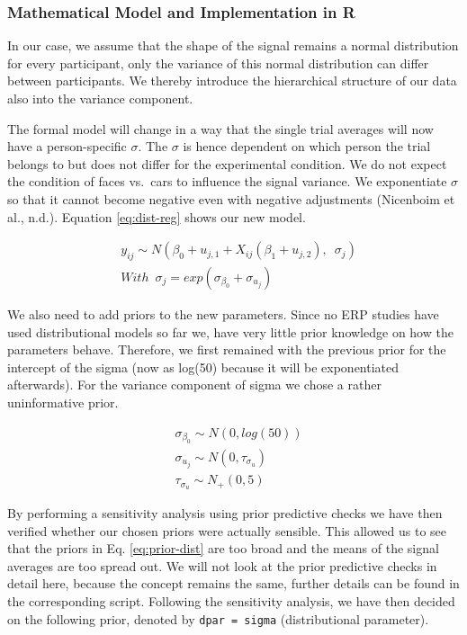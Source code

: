 \documentclass[
  doc,12pt,floatsintext]{apa7}
\begin{document}
\subsubsection{Mathematical Model and Implementation in R}\label{mathematical-model-and-implementation-in-r-1}

In our case, we assume that the shape of the signal remains a normal distribution for every participant, only the variance of this normal distribution can differ between participants. We thereby introduce the hierarchical structure of our data also into the variance component.

The formal model will change in a way that the single trial averages will now have a person-specific \(\sigma\). The \(\sigma\) is hence dependent on which person the trial belongs to but does not differ for the experimental condition. We do not expect the condition of faces vs.~cars to influence the signal variance. We exponentiate \(\sigma\) so that it cannot become negative even with negative adjustments (Nicenboim et al., n.d.). Equation \eqref{eq:dist-reg} shows our new model.

\begin{equation}
\begin{split}
& y_{ij} \sim N(\beta_0 + u_{j,1} + X_{ij}(\beta_1 + u_{j,2}), \enspace \sigma_j) \\
& With \enspace \sigma_j = exp(\sigma_{\beta_0} + \sigma_{u_j})
\end{split}
\label{eq:dist-reg}
\end{equation}

We also need to add priors to the new parameters. Since no ERP studies have used distributional models so far we, have very little prior knowledge on how the parameters behave. Therefore, we first remained with the previous prior for the intercept of the sigma (now as log(50) because it will be exponentiated afterwards). For the variance component of sigma we chose a rather uninformative prior.

\begin{equation}
\begin{split}
& \sigma_{\beta_0} \sim N(0, log(50)) \\
& \sigma_{u_j} \sim N(0, \tau_{\sigma_u}) \\
& \tau_{\sigma_u} \sim N_{+}(0,5)
\end{split}
\label{eq:prior-dist}
\end{equation}

By performing a sensitivity analysis using prior predictive checks we have then verified whether our chosen priors were actually sensible. This allowed us to see that the priors in Eq. \eqref{eq:prior-dist} are too broad and the means of the signal averages are too spread out. We will not look at the prior predictive checks in detail here, because the concept remains the same, further details can be found in the corresponding script. Following the sensitivity analysis, we have then decided on the following prior, denoted by \texttt{dpar\ =\ sigma} (distributional parameter).
\end{document}

